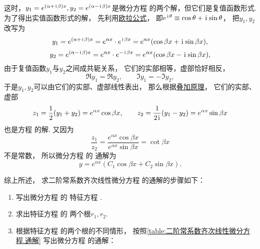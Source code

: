 \begin{enumerate}
	这时，\(y_1 = e^{(\alpha+\kern1pt\mathrm{i}\kern1pt\beta)x}, y_2 = e^{(\alpha-\kern1pt\mathrm{i}\kern1pt\beta)x}\)是微分方程  的两个解，但它们是复值函数形式.
	为了得出实值函数形式的解，
	先利用\hyperref[equation:复数.欧拉公式]{欧拉公式}，
	即\(e^{\kern1pt\mathrm{i}\kern1pt\theta} \equiv \cos\theta+\kern1pt\mathrm{i}\kern1pt\sin\theta\)，
	把\(y_1,y_2\)改写为\[
		y_1 = e^{(\alpha+\kern1pt\mathrm{i}\kern1pt\beta)x} = e^{\alpha x} \cdot e^{\kern1pt\mathrm{i}\kern1pt\beta x}
		= e^{\alpha x} (\cos\beta x + \kern1pt\mathrm{i}\kern1pt \sin\beta x),
	\]\[
		y_2 = e^{(\alpha-\kern1pt\mathrm{i}\kern1pt\beta)x} = e^{\alpha x} \cdot e^{-\kern1pt\mathrm{i}\kern1pt\beta x}
		= e^{\alpha x} (\cos\beta x - \kern1pt\mathrm{i}\kern1pt \sin\beta x),
	\]
	由于复值函数\(y_1\)与\(y_2\)之间成共轭关系，
	它们的实部相等，虚部恰好相反，\[
		\Re y_1 = \Re y_2, \qquad
		\Im y_1 = -\Im y_2,
	\]
	于是\(y_1,y_2\)可以由它们的实部、虚部线性表出，
	那么根据\hyperref[theorem:微分方程.二阶非齐次线性微分方程的解的叠加原理]{叠加原理}，
	它们的实部、虚部\[
		z_1 = \frac{1}{2} (y_1 + y_2) = e^{\alpha x} \cos\beta x,
		\qquad
		z_2 = \frac{1}{2\kern1pt\mathrm{i}\kern1pt} (y_1 - y_2) = e^{\alpha x} \sin\beta x
	\]也是方程  的解.
	又因为\[
		\frac{z_1}{z_2}
		= \frac{e^{\alpha x} \cos\beta x}{e^{\alpha x} \sin\beta x}
		= \cot\beta x
	\]不是常数，
	所以微分方程  的
	通解为\begin{equation}
		y = e^{\alpha x} (C_1 \cos\beta x + C_2 \sin\beta x).
	\end{equation}
\end{enumerate}

综上所述，
求二阶常系数齐次线性微分方程  的通解的步骤如下：
\begin{enumerate}
	\item
	写出微分方程  的
	特征方程 .

	\item
	求出特征方程  的
	两个根\(r_1,r_2\).

	\item
	根据特征方程  的两个根的不同情形，
	按照\cref{table:二阶常系数齐次线性微分方程.通解}
	写出微分方程  的通解：
\end{enumerate}

